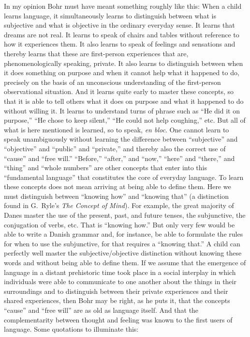 \documentclass[12pt,a4paper]{book}
\begin{document}
In my opinion Bohr must have meant something roughly like this: When a child learns language, it simultaneously learns to distinguish between what is subjective and what is objective in the ordinary everyday sense. It learns that dreams are not real. It learns to speak of chairs and tables without reference to how it experiences them. It also learns to speak of feelings and sensations and thereby learns that these are first-person experiences that are, phenomenologically speaking, private. It also learns to distinguish between when it does something on purpose and when it cannot help what it happened to do, precisely on the basis of an unconscious understanding of the first-person observational situation. And it learns quite early to master these concepts, so that it is able to tell others what it does on purpose and what it happened to do without willing it. It learns to understand turns of phrase such as ``He did it on purpose,'' ``He chose to keep silent,'' ``He could not help coughing,'' etc. But all of what is here mentioned is learned, so to speak, \textit{en bloc}. One cannot learn to speak unambiguously without learning the difference between ``subjective'' and ``objective'' and ``public'' and ``private,'' and thereby also the correct use of ``cause'' and ``free will.'' ``Before,'' ``after,'' and ``now,'' ``here'' and ``there,'' and ``thing'' and ``whole numbers'' are other concepts that enter into this ``fundamental language'' that constitutes the core of everyday language. To learn these concepts does not mean arriving at being able to define them. Here we must distinguish between ``knowing how'' and ``knowing that'' (a distinction found in G.~Ryle's \emph{The Concept of Mind}). For example, the great majority of Danes master the use of the present, past, and future tenses, the subjunctive, the conjugation of verbs, etc. That is ``knowing how.'' But only very few would be able to write a Danish grammar and, for instance, be able to formulate the rules for when to use the subjunctive, for that requires a ``knowing that.'' A child can perfectly well master the subjective/objective distinction without knowing these words and without being able to define them. If we assume that the emergence of language in a distant prehistoric time took place in a social interplay in which individuals were able to communicate to one another about the things in their surroundings and to distinguish between their private experiences and their shared experiences, then Bohr may be right, as he puts it, that the concepts ``cause'' and ``free will'' are as old as language itself. And that the complementarity between thought and feeling was known to the first users of language. Some quotations to illuminate this:
\end{document}
